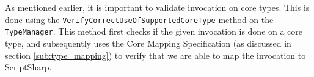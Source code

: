 As mentioned earlier, it is important to validate invocation on core types. This is done using the \texttt{VerifyCorrectUseOfSupportedCoreType} method on the \texttt{TypeManager}. This method first checks if the given invocation is done on a core type, and subsequently uses the Core Mapping Specification (as discussed in section \ref{sub:type_mapping}) to verify that we are able to map the invocation to ScriptSharp.
		











	
